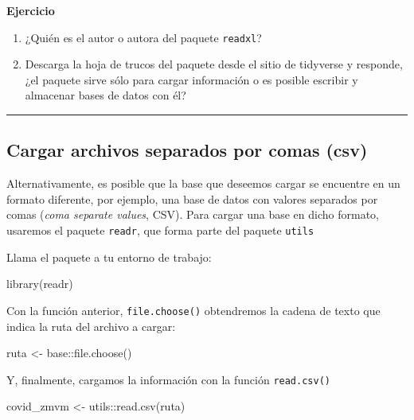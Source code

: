 \documentclass[
  11pt,
  oneside]{book}
\newenvironment{Shaded}{\begin{snugshade}}{\end{snugshade}}
\newcommand{\FunctionTok}[1]{\textcolor[rgb]{0.00,0.00,0.00}{#1}}
\newcommand{\NormalTok}[1]{#1}
\newcommand{\OtherTok}[1]{\textcolor[rgb]{0.56,0.35,0.01}{#1}}
\newcommand{\SpecialCharTok}[1]{\textcolor[rgb]{0.00,0.00,0.00}{#1}}
\begin{document}
\textbf{Ejercicio}

\begin{enumerate}
\def\labelenumi{\arabic{enumi}.}
\item
  ¿Quién es el autor o autora del paquete \texttt{readxl}?
\item
  Descarga la hoja de trucos del paquete desde el sitio de tidyverse y responde, ¿el paquete sirve sólo para cargar información o es posible escribir y almacenar bases de datos con él?
\end{enumerate}

\begin{center}\rule{0.5\linewidth}{0.5pt}\end{center}

\hypertarget{cargar-archivos-separados-por-comas-csv}{%
\subsection{Cargar archivos separados por comas (csv)}\label{cargar-archivos-separados-por-comas-csv}}

Alternativamente, es posible que la base que deseemos cargar se encuentre en un formato diferente, por ejemplo, una base de datos con valores separados por comas (\emph{coma separate values}, CSV). Para cargar una base en dicho formato, usaremos el paquete \texttt{readr}, que forma parte del paquete \texttt{utils}

Llama el paquete a tu entorno de trabajo:

\begin{Shaded}
\begin{Highlighting}[]
\FunctionTok{library}\NormalTok{(readr)}
\end{Highlighting}
\end{Shaded}

Con la función anterior, \texttt{file.choose()} obtendremos la cadena de texto que indica la ruta del archivo a cargar:

\begin{Shaded}
\begin{Highlighting}[]
\NormalTok{ruta }\OtherTok{\textless{}{-}}\NormalTok{ base}\SpecialCharTok{::}\FunctionTok{file.choose}\NormalTok{()}
\end{Highlighting}
\end{Shaded}

Y, finalmente, cargamos la información con la función \texttt{read.csv()}

\begin{Shaded}
\begin{Highlighting}[]
\NormalTok{covid\_zmvm }\OtherTok{\textless{}{-}}\NormalTok{ utils}\SpecialCharTok{::}\FunctionTok{read.csv}\NormalTok{(ruta)}
\end{Highlighting}
\end{Shaded}
\end{document}
